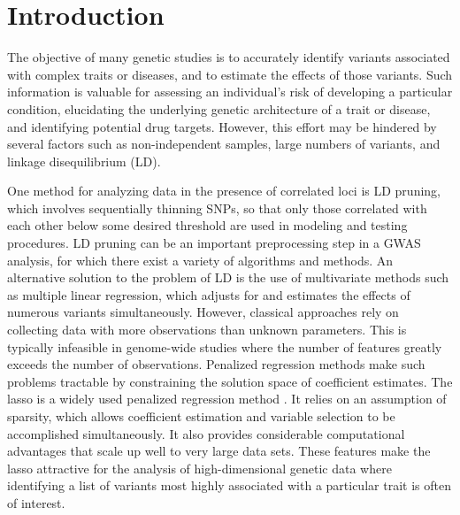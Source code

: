 
\section{Introduction}


The objective of many genetic studies is to accurately identify variants associated with complex traits or diseases, and to estimate the effects of those variants. Such information is valuable for assessing an individual's risk of developing a particular condition, elucidating the underlying genetic architecture of a trait or disease, and identifying potential drug targets. However, this effort may be hindered by several factors such as non-independent samples, large numbers of variants, and linkage disequilibrium (LD). 


One method for analyzing data in the presence of correlated loci is LD pruning, which involves sequentially thinning SNPs, so that only those correlated with each other below some desired threshold are used in modeling and testing procedures. LD pruning can be an important preprocessing step in a GWAS analysis, for which there exist a variety of algorithms and methods. An alternative solution to the problem of LD is the use of multivariate methods such as multiple linear regression, which adjusts for and estimates the effects of numerous variants simultaneously. However, classical approaches rely on collecting data with more observations than unknown parameters. This is typically infeasible in genome-wide studies where the number of features greatly exceeds the number of observations. Penalized regression methods make such problems tractable by constraining the solution space of coefficient estimates. The lasso is a widely used penalized regression method \citep{tibshirani1996regression}. It relies on an assumption of sparsity, which allows coefficient estimation and variable selection to be accomplished simultaneously. It also provides considerable computational advantages that scale up well to very large data sets. These features make the lasso attractive for the analysis of high-dimensional genetic data where identifying a list of variants most highly associated with a particular trait is often of interest.

